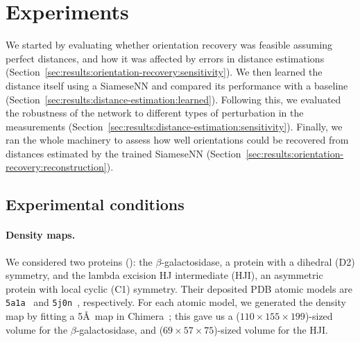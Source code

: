 \section{Experiments}\label{sec:experiments}



We started by evaluating whether orientation recovery was feasible assuming perfect distances, and how it was affected by errors in distance estimations (Section~\ref{sec:results:orientation-recovery:sensitivity}).
We then learned the distance itself using a SiameseNN and compared its performance with a baseline (Section~\ref{sec:results:distance-estimation:learned}).
Following this, we evaluated the robustness of the network to different types of perturbation in the measurements (Section~\ref{sec:results:distance-estimation:sensitivity}).
Finally, we ran the whole machinery to assess how well orientations could be recovered from distances estimated by the trained SiameseNN (Section~\ref{sec:results:orientation-recovery:reconstruction}).


\subsection{Experimental conditions}\label{sec:results:data}

\paragraph{Density maps.}
We considered two proteins (): the $\beta$-galactosidase, a protein with a dihedral (D2) symmetry, and the lambda excision HJ intermediate (HJI), an asymmetric protein with local cyclic (C1) symmetry.
Their deposited PDB atomic models are \texttt{5a1a}~\cite{bartesaghi2015betagal} and \texttt{5j0n}~\cite{laxmikanthan2016structure}, respectively.
For each atomic model, we generated the density map by fitting a 5\AA\ map in Chimera~\cite{pettersen2004ucsf}; this gave us a ($110 \times 155 \times 199$)-sized volume for the $\beta$-galactosidase, and ($69 \times 57 \times 75$)-sized volume for the HJI.

